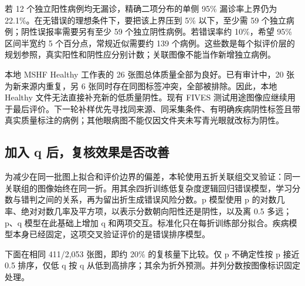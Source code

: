 \documentclass[
  10pt,
]{article}
\begin{document}
若 12 个独立阳性病例均无漏诊，精确二项分布的单侧 95\% 漏诊率上界仍为
22.1\%。在无错误的理想条件下，要把该上界压到 5\% 以下，至少需 59
个独立病例；阴性误报率需要另有至少 59 个独立阴性病例。若错误率约
10\%，希望 95\% 区间半宽约 5 个百分点，常规近似需要约 139
个病例。这些数是每个拟评价层的规划参照，真实阳性和阴性应分别计数；关联图像不能当作新增独立病例。

本地 MSHF Healthy 工作表的 26 张图总体质量全部为良好。已有审计中，20
张为新来源内重复，另 6 张同时存在同图标签冲突，全部被排除。因此，本地
Healthy 文件无法直接补充新的低质量阴性。现有 FIVES
测试用途图像应继续用于最后评价。下一轮补样优先寻找同来源、同采集条件、有明确疾病阴性标签且带真实质量标注的病例；其他眼病图不能仅因文件夹未写青光眼就改标为阴性。

\subsection{加入 q
后，复核效果是否改善}\label{ux52a0ux5165-q-ux540eux590dux6838ux6548ux679cux662fux5426ux6539ux5584}

为减少在同一批图上拟合和评价边界的偏差，本轮使用五折关联组交叉验证：同一关联组的图像始终在同一折。用其余四折训练低复杂度逻辑回归错误模型，学习分数与错判之间的关系，再为留出折生成错误风险分数。p
模型使用 p
的对数几率、绝对对数几率及平方项，以表示分数朝向阳性还是阴性，以及离 0.5
多远；p、q 模型在此基础上增加 q
和两项交互。标准化只在每折训练部分拟合。疾病模型本身已经固定，这项交叉验证评价的是错误排序模型。

下面在相同 411/2,053 张图，即约 20\% 的复核量下比较。仅 p 不确定性按 p
接近 0.5 排序，仅低 q 按 q
从低到高排序；其余为折外预测。并列分数按图像标识固定处理。
\end{document}
